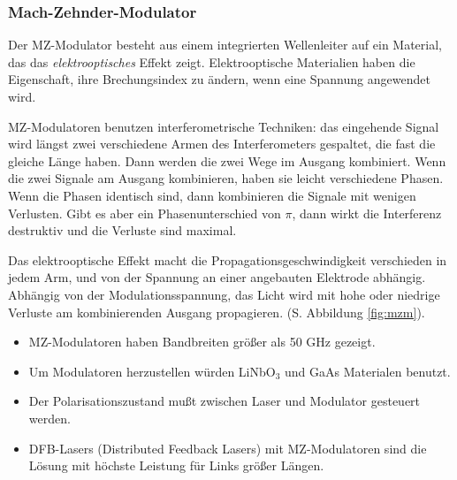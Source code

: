 \documentclass[a4paper]{article}
\begin{document}
\subsubsection{Mach-Zehnder-Modulator}
Der MZ-Modulator besteht aus einem integrierten Wellenleiter auf ein Material,
das das \emph{elektrooptisches} Effekt zeigt. Elektrooptische Materialien haben die
Eigenschaft, ihre Brechungsindex zu ändern, wenn eine Spannung angewendet wird.

MZ-Modulatoren benutzen interferometrische Techniken: das eingehende Signal
wird längst zwei verschiedene Armen des Interferometers gespaltet, die fast die
gleiche Länge haben. Dann werden die zwei Wege im Ausgang kombiniert. Wenn die
zwei Signale am Ausgang kombinieren, haben sie leicht verschiedene Phasen. Wenn
die Phasen identisch sind, dann kombinieren die Signale mit wenigen Verlusten.
Gibt es aber ein Phasenunterschied von $\pi$, dann wirkt die Interferenz
destruktiv und die Verluste sind maximal.

Das elektrooptische Effekt macht die Propagationsgeschwindigkeit verschieden in
jedem Arm, und von der Spannung an einer angebauten Elektrode abhängig.
Abhängig von der Modulationsspannung, das Licht wird mit hohe oder niedrige
Verluste am kombinierenden Ausgang propagieren. (S. Abbildung \ref{fig:mzm}). 

\begin{itemize}
  \item MZ-Modulatoren haben Bandbreiten größer als 50 GHz gezeigt. 
    
  \item Um Modulatoren herzustellen würden LiNbO$_3$ und GaAs Materialen
    benutzt. 

  \item Der Polarisationszustand mußt zwischen Laser und Modulator gesteuert
    werden.

  \item DFB-Lasers (Distributed Feedback Lasers) mit MZ-Modulatoren sind die Lösung mit höchste Leistung für
    Links größer Längen.
\end{itemize}
\end{document}
